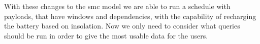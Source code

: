 With these changes to the \gls{smc} model we are able to run a schedule with payloads, that have windows and dependencies, with the capability of recharging the battery based on insolation. Now we only need to consider what queries should be run in order to give the most usable data for the users.





